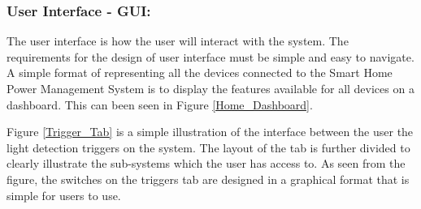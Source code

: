 \documentclass[10pt,twocolumn]{witseiepaper}
\begin{document}
	\subsubsection{User Interface - GUI:}
	The user interface is how the user will interact with the system. The requirements for the design of user interface must be simple and easy to navigate. A simple format of representing all the devices connected to the Smart Home Power Management System is to display the features available for all devices on a dashboard. This can been seen in Figure \ref{Home_Dashboard}.
	
	Figure \ref{Trigger_Tab} is a simple illustration of the interface between the user the light detection triggers on the system. The layout of the tab is further divided to clearly illustrate the sub-systems which the user has access to. As seen from the figure, the switches on the triggers tab are designed in a graphical format that is simple for users to use.  
	
\end{document}
